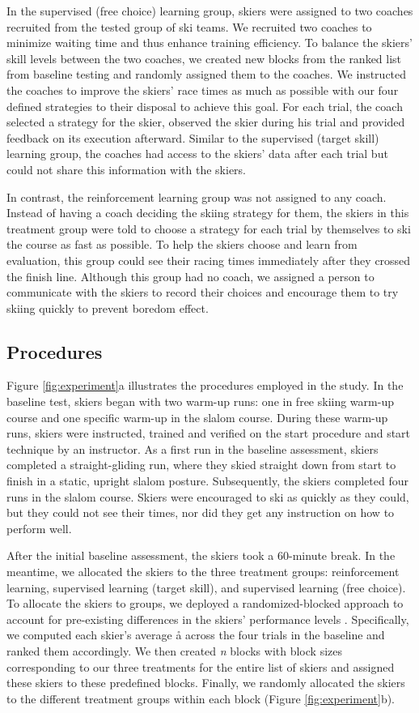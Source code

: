 \documentclass[pdflatex,sn-mathphys-num]{sn-jnl}%
\theoremstyle{thmstyleone}%
\theoremstyle{thmstyletwo}%
\theoremstyle{thmstylethree}%
\begin{document}
In the supervised (free choice) learning group, skiers were assigned to two coaches recruited from the tested group of ski teams. We recruited two coaches to minimize waiting time and thus enhance training efficiency. To balance the skiers' skill levels between the two coaches, we created new blocks from the ranked list from baseline testing and randomly assigned them to the coaches. We instructed the coaches to improve the skiers' race times as much as possible with our four defined strategies to their disposal to achieve this goal. For each trial, the coach selected a strategy for the skier, observed the skier during his trial and provided feedback on its execution afterward. Similar to the supervised (target skill) learning group, the coaches had access to the skiers' data after each trial but could not share this information with the skiers.

In contrast, the reinforcement learning group was not assigned to any coach. Instead of having a coach deciding the skiing strategy for them, the skiers in this treatment group were told to choose a strategy for each trial by themselves to ski the course as fast as possible. To help the skiers choose and learn from evaluation, this group could see their racing times immediately after they crossed the finish line. Although this group had no coach, we assigned a person to communicate with the skiers to record their choices and encourage them to try skiing quickly to prevent boredom effect.

\subsection{Procedures}\label{subsec4}
Figure \ref{fig:experiment}a illustrates the procedures employed in the study. 
In the baseline test, skiers began with two warm-up runs: one in free skiing warm-up course and one specific warm-up in the slalom course. During these warm-up runs, skiers were instructed, trained and verified on the start procedure and start technique by an instructor. As a first run in the baseline assessment, skiers completed a straight-gliding run, where they skied straight down from start to finish in a static, upright slalom posture. Subsequently, the skiers completed four runs in the slalom course. Skiers were encouraged to ski as quickly as they could, but they could not see their times, nor did they get any instruction on how to perform well. 

After the initial baseline assessment, the skiers took a 60-minute break. In the meantime, we allocated the skiers to the three treatment groups: reinforcement learning, supervised learning (target skill), and supervised learning (free choice). To allocate the skiers to groups, we deployed a randomized-blocked approach to account for pre-existing differences in the skiers’ performance levels \cite{maxwell_designing_2017}. Specifically, we computed each skier’s average å across the four trials in the baseline and ranked them accordingly. We then created \textit{n} blocks with block sizes corresponding to our three treatments for the entire list of skiers and assigned these skiers to these predefined blocks. Finally, we randomly allocated the skiers to the different treatment groups within each block (Figure \ref{fig:experiment}b).
\end{document}
